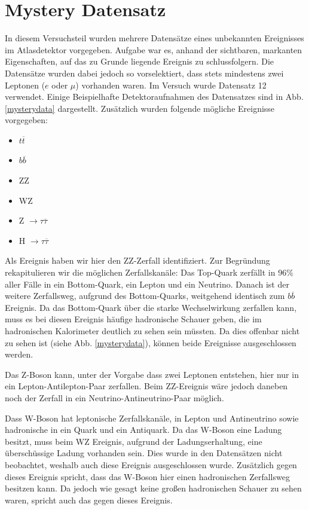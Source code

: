 \section{Mystery Datensatz}

In diesem Versuchsteil wurden mehrere Datensätze eines unbekannten Ereignisses im Atlasdetektor vorgegeben.
Aufgabe war es, anhand der sichtbaren, markanten Eigenschaften, auf das zu Grunde liegende Ereignis zu schlussfolgern. 
Die Datensätze wurden dabei jedoch so vorselektiert, dass stets mindestens zwei Leptonen ($e$ oder $\mu$) vorhanden waren.
Im Versuch wurde Datensatz 12 verwendet.
Einige Beispielhafte Detektoraufnahmen des Datensatzes sind in Abb. \ref{mysterydata} dargestellt.
Zusätzlich wurden folgende mögliche Ereignisse vorgegeben:
\begin{itemize}
\item $t \overline{t}$
\item $b \overline{b}$
\item ZZ
\item WZ
\item Z $\rightarrow \tau \overline{\tau}$
\item H $\rightarrow \tau \overline{\tau}$
\end{itemize}


Als Ereignis haben wir hier den ZZ-Zerfall identifiziert.
Zur Begründung rekapitulieren wir die möglichen Zerfallskanäle:
Das Top-Quark zerfällt in 96\% aller Fälle in ein Bottom-Quark, ein Lepton und ein Neutrino.
Danach ist der weitere Zerfallsweg, aufgrund des Bottom-Quarks, weitgehend identisch zum $b \overline{b}$ Ereignis.
Da das Bottom-Quark über die starke Wechselwirkung zerfallen kann, muss es bei diesen Ereignis häufige hadronische Schauer geben, die im hadronischen Kalorimeter deutlich zu sehen sein müssten.
Da dies offenbar nicht zu sehen ist (siehe Abb. \ref{mysterydata}), können beide Ereignisse ausgeschlossen werden.

Das Z-Boson kann, unter der Vorgabe dass zwei Leptonen entstehen, hier nur in ein Lepton-Antilepton-Paar zerfallen.
Beim ZZ-Ereignis wäre jedoch daneben noch der Zerfall in ein Neutrino-Antineutrino-Paar möglich.

Dass W-Boson hat leptonische Zerfallskanäle, in Lepton und Antineutrino sowie hadronische in ein Quark und ein Antiquark.
Da das W-Boson eine Ladung besitzt, muss beim WZ Ereignis, aufgrund der Ladungserhaltung, eine überschüssige Ladung vorhanden sein.
Dies wurde in den Datensätzen nicht beobachtet, weshalb auch diese Ereignis ausgeschlossen wurde.
Zusätzlich gegen dieses Ereignis spricht, dass das W-Boson hier einen hadronischen Zerfallsweg besitzen kann.
Da jedoch wie gesagt keine großen hadronischen Schauer zu sehen waren, spricht auch das gegen dieses Ereignis.

